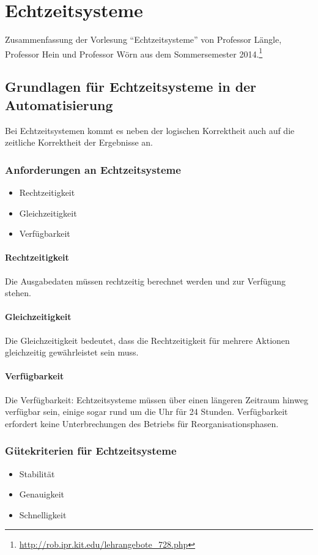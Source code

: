 \chapter{Echtzeitsysteme}

Zusammenfassung der Vorlesung "`Echtzeitsysteme"' von Professor Längle, Professor Hein und Professor Wörn aus dem Sommersemester 2014.\footnote{\url{http://rob.ipr.kit.edu/lehrangebote_728.php}}



\section{Grundlagen für Echtzeitsysteme in der Automatisierung}

Bei Echtzeitsystemen kommt es neben der logischen Korrektheit auch auf die zeitliche Korrektheit der Ergebnisse an.

\subsection{Anforderungen an Echtzeitsysteme}
\begin{itemize}
	\item Rechtzeitigkeit
	\item Gleichzeitigkeit
	\item Verfügbarkeit
\end{itemize}

\subsubsection{Rechtzeitigkeit}
Die Ausgabedaten müssen rechtzeitig berechnet werden und zur Verfügung stehen.

\subsubsection{Gleichzeitigkeit}
Die Gleichzeitigkeit bedeutet, dass die Rechtzeitigkeit für mehrere Aktionen gleichzeitig gewährleistet sein muss.

\subsubsection{Verfügbarkeit}
Die Verfügbarkeit: Echtzeitsysteme müssen über einen längeren Zeitraum hinweg verfügbar sein, einige sogar rund um die Uhr für 24 Stunden. Verfügbarkeit erfordert keine Unterbrechungen des Betriebs für Reorganisationsphasen.

\subsection{Gütekriterien für Echtzeitsysteme}
\begin{itemize}
	\item Stabilität
	\item Genauigkeit
	\item Schnelligkeit
\end{itemize}



